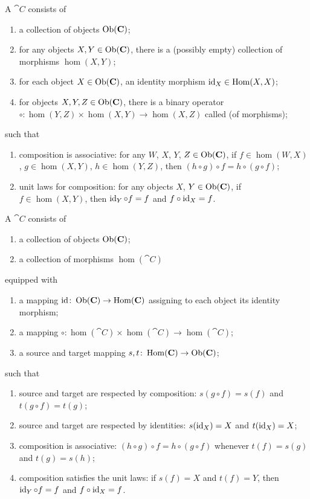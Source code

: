 \begin{node}[Category]\label{cat-0001}%
\begin{definition}[Version 1]
A  $\cat{C}$ consists of
\begin{enumerate}
\item a collection of objects $\operatorname{Ob}(\mathbf{C})$;
\item for any objects $X,Y\in\operatorname{Ob}(\mathbf{C})$, there is a (possibly empty)
  collection of morphisms $\hom(X,Y)$;
\item for each object $X\in\operatorname{Ob}(\mathbf{C})$, an identity morphism $\operatorname{id}_{X}\in\operatorname{Hom}(X,X)$;
\item for objects $X,Y,Z\in\operatorname{Ob}(\mathbf{C})$, there is a binary operator
  $\circ\colon\hom(Y,Z)\times\hom(X,Y)\to\hom(X,Z)$ called
   (of morphisms);
\end{enumerate}
such that
\begin{enumerate}
\item composition is associative: for any $W$, $X$, $Y$, $Z\in\operatorname{Ob}(\mathbf{C})$, if
  $f\in\hom(W,X)$, $g\in\hom(X,Y)$, $h\in\hom(Y,Z)$, then $(h\circ g)\circ f=h\circ(g\circ f)$;
\item unit laws for composition: for any objects $X$, $Y\in\operatorname{Ob}(\mathbf{C})$,
  if $f\in\hom(X,Y)$, then $\operatorname{id}_{Y}\circ f=f$ and $f\circ\operatorname{id}_{X}=f$.
\end{enumerate}
\end{definition}

\begin{definition}[Version 2]\label{cat-0000}%
A  $\cat{C}$ consists of
\begin{enumerate}
\item a collection of objects $\operatorname{Ob}(\mathbf{C})$;
\item a collection of morphisms $\hom(\cat{C})$
\end{enumerate}
equipped with
\begin{enumerate}
\item a mapping $\operatorname{id}\colon\operatorname{Ob}(\mathbf{C})\to\operatorname{Hom}(\mathbf{C})$ assigning to
  each object its identity morphism;
\item a mapping $\circ\colon\hom(\cat{C})\times\hom(\cat{C})\to\hom(\cat{C})$;
\item a source and target mapping $s,t\colon\operatorname{Hom}(\mathbf{C})\to\operatorname{Ob}(\mathbf{C})$;
\end{enumerate}
such that
\begin{enumerate}
\item source and target are respected by composition: $s(g\circ f)=s(f)$
  and $t(g\circ f)=t(g)$;
\item source and target are respected by identities: $s(\operatorname{id}_{X})=X$ and $t(\operatorname{id}_{X})=X$;
\item composition is associative: $(h\circ g)\circ f=h\circ(g\circ f)$
  whenever $t(f)=s(g)$ and $t(g)=s(h)$;
\item composition satisfies the unit laws: if $s(f)=X$ and $t(f)=Y$,
  then $\operatorname{id}_{Y}\circ f=f$ and $f\circ\operatorname{id}_{X}=f$.
\end{enumerate}
\end{definition}


\end{node}
